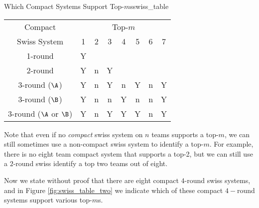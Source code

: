 {    \begin{figg}{Which Compact Systems Support Top-$m$s}{swiss_table}
        \begin{center}
            \begin{tabular}{ c | c c c c c c c }
            Compact & & & \multicolumn{3}{c}{Top-$m$} & &\\
            Swiss System& 1 & 2 & 3 & 4 & 5 & 6 & 7\\
            \hline
            1-round & Y & &  &  &  &  & \\
            2-round & Y & n & Y & &  &  & \\
            3-round ($\A$) & Y & n & Y & n & Y & n & Y  \\
            3-round ($\B$) & Y & n & n & Y & n & n  & Y \\
            3-round ($\A$ or $\B$) & Y & n & Y & Y & Y & n  & Y  \\
            \end{tabular}
        \end{center}
    \end{figg} 

    Note that even if no \textit{compact} swiss system on $n$ teams supports a top-$m$, we can still sometimes use a non-compact swiss system to identify a top-$m.$ For example, there is no eight team compact system that supports a top-2, but we can still use a $2$-round swiss identify a top two teams out of eight.

    Now we state without proof that there are eight compact $4$-round swiss systems, and in Figure \ref{fig:swiss_table_two} we indicate which of these compact $4-$round systems support various top-$m$s.

}
